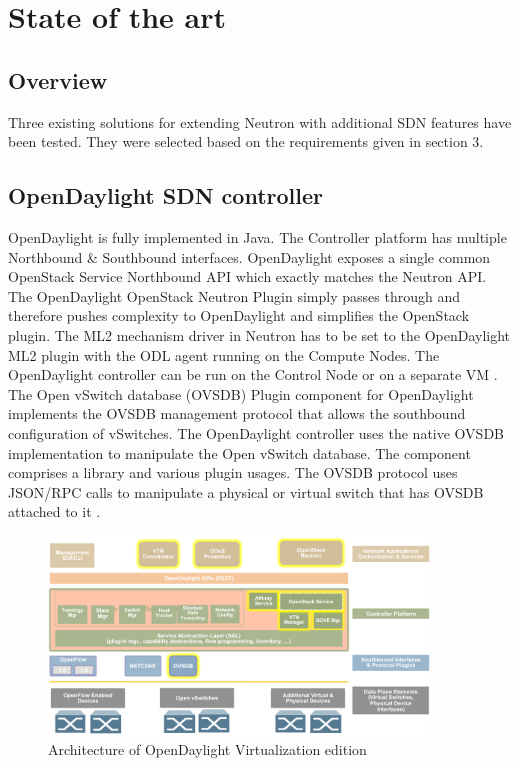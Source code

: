 \chapter{State of the art}

\section{Overview}

Three existing solutions for extending Neutron with additional SDN features have been tested. They were selected based on the requirements given in section 3.

\section{OpenDaylight SDN controller}


OpenDaylight is fully implemented in Java. The Controller platform has multiple Northbound \& Southbound interfaces. OpenDaylight exposes a single common OpenStack Service Northbound API which exactly matches the Neutron API. The OpenDaylight OpenStack Neutron Plugin simply passes through and therefore pushes complexity to OpenDaylight and simplifies the OpenStack plugin. The ML2 mechanism driver in Neutron has to be set to the OpenDaylight ML2 plugin with the ODL agent running on the Compute Nodes. The OpenDaylight controller can be run on the Control Node or on a separate VM \cite{odl-intro}. The Open vSwitch database (OVSDB) Plugin component for OpenDaylight implements the OVSDB management protocol that allows the southbound configuration of vSwitches. The OpenDaylight controller uses the native OVSDB implementation to manipulate the Open vSwitch database. The component comprises a library and various plugin usages. The OVSDB protocol uses JSON/RPC calls to manipulate a physical or virtual switch that has OVSDB attached to it \cite{odl-ovsdb}.

\begin{figure}[H]
\centering
\includegraphics[width=0.9\textwidth]{images/sota/odl_architecture.png}
\caption{Architecture of OpenDaylight Virtualization edition}
\end{figure}

